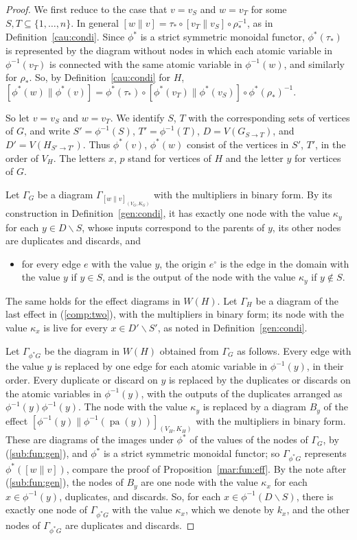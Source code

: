 \documentclass[12pt]{amsart}
\theoremstyle{plain}
\theoremstyle{definition}
\theoremstyle{remark}
\numberwithin{equation}{section}
\theoremstyle{plain}
\newcommand{\0}{\emptyset}
\newcommand{\sub}{\subseteq}
\newcommand{\mi}{\smallsetminus}
\DeclareMathOperator{\pa}{pa}
\newcommand{\stri}{\Gamma}
\begin{document}
\begin{proof}
We first reduce to the case that $v = v_S$ and $w = v_T$ for some $S, T \sub \{1, \ldots, n\}$. In general $[w \| v] = \tau_* \circ [v_T \| v_S] \circ \rho_*^{-1}$, as in Definition~\ref{cau:condi}. Since $\phi^*$ is a strict symmetric monoidal functor, $\phi^*(\tau_*)$ is represented by the diagram without nodes in which each atomic variable in $\phi^{-1}(v_T)$ is connected with the same atomic variable in $\phi^{-1}(w)$, and similarly for $\rho_*$. So, by Definition~\ref{cau:condi} for $H$, $[\phi^*(w) \| \phi^*(v)] = \phi^*(\tau_*) \circ [\phi^*(v_T) \| \phi^*(v_S)] \circ \phi^*(\rho_*)^{-1}$.

So let $v = v_S$ and $w = v_T$. We identify $S$, $T$ with the corresponding sets of vertices of $G$, and write $S' = \phi^{-1}(S)$, $T' = \phi^{-1}(T)$, $D = V(G_{S \rightarrow T})$, and $D' = V(H_{S' \rightarrow T'})$. Thus $\phi^*(v)$, $\phi^*(w)$ consist of the vertices in $S'$, $T'$, in the order of $V_H$. The letters $x$, $p$ stand for vertices of $H$ and the letter $y$ for vertices of $G$.

Let $\Gamma_G$ be a diagram $\stri_{[w \| v]_{(V_G, K_G)}}$ with the multipliers in binary form. By its construction in Definition~\ref{gen:condi}, it has exactly one node with the value $\kappa_y$ for each $y \in D \mi S$, whose inputs correspond to the parents of $y$, its other nodes are duplicates and discards, and
\begin{itemize}
  \item[($*$)] for every edge $e$ with the value $y$, the origin $e^{\circ}$ is the edge in the domain with the value $y$ if $y \in S$, and is the output of the node with the value $\kappa_y$ if $y \notin S$.
\end{itemize}
The same holds for the effect diagrams in $W(H)$. Let $\Gamma_H$ be a diagram of the last effect in (\ref{comp:two}), with the multipliers in binary form; its node with the value $\kappa_x$ is live for every $x \in D' \mi S'$, as noted in Definition~\ref{gen:condi}.

Let $\Gamma_{\phi^* G}$ be the diagram in $W(H)$ obtained from $\Gamma_G$ as follows. Every edge with the value $y$ is replaced by one edge for each atomic variable in $\phi^{-1}(y)$, in their order. Every duplicate or discard on $y$ is replaced by the duplicates or discards on the atomic variables in $\phi^{-1}(y)$, with the outputs of the duplicates arranged as $\phi^{-1}(y) \phi^{-1}(y)$. The node with the value $\kappa_y$ is replaced by a diagram $B_y$ of the effect $[\phi^{-1}(y) \| \phi^{-1}(\pa(y))]_{(V_H, K_H)}$ with the multipliers in binary form. These are diagrams of the images under $\phi^*$ of the values of the nodes of $\Gamma_G$, by (\ref{sub:fun:gen}), and $\phi^*$ is a strict symmetric monoidal functor; so $\Gamma_{\phi^* G}$ represents $\phi^*([w \| v])$, compare the proof of Proposition~\ref{mar:fun:eff}. By the note after (\ref{sub:fun:gen}), the nodes of $B_y$ are one node with the value $\kappa_x$ for each $x \in \phi^{-1}(y)$, duplicates, and discards. So, for each $x \in \phi^{-1}(D \mi S)$, there is exactly one node of $\Gamma_{\phi^* G}$ with the value $\kappa_x$, which we denote by $k_x$, and the other nodes of $\Gamma_{\phi^* G}$ are duplicates and discards.


\end{proof}
\end{document}
